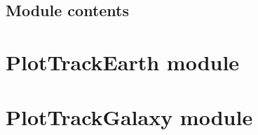 \documentclass[letterpaper,10pt,english]{sphinxmanual}
\begin{document}

\begin{fulllineitems}
\label{\detokenize{Particle:Particle.functions.ConvertUnits}}
\pysigstartsignatures
{}
\pysigstopsignatures
\end{fulllineitems}


\begin{fulllineitems}
\label{\detokenize{Particle:Particle.functions.GetAntiParticle}}
\pysigstartsignatures
{}
\pysigstopsignatures
\end{fulllineitems}



\subsection{Module contents}
\label{\detokenize{Particle:module-Particle}}\label{\detokenize{Particle:module-contents}}
\sphinxstepscope


\section{PlotTrackEarth module}
\label{\detokenize{PlotTrackEarth:plottrackearth-module}}\label{\detokenize{PlotTrackEarth::doc}}
\sphinxstepscope


\section{PlotTrackGalaxy module}
\label{\detokenize{PlotTrackGalaxy:plottrackgalaxy-module}}\label{\detokenize{PlotTrackGalaxy::doc}}
\sphinxstepscope
\end{document}

